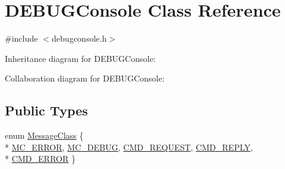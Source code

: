 \hypertarget{class_d_e_b_u_g_console}{}\section{D\+E\+B\+U\+G\+Console Class Reference}
\label{class_d_e_b_u_g_console}


{\ttfamily \#include $<$debugconsole.\+h$>$}



Inheritance diagram for D\+E\+B\+U\+G\+Console\+:


Collaboration diagram for D\+E\+B\+U\+G\+Console\+:
\subsection*{Public Types}
\begin{DoxyCompactItemize}
\item 
enum \hyperlink{class_d_e_b_u_g_console_ab4d5228b2f3681131add4278aca4127f}{Message\+Class} \{ \\*
\hyperlink{class_d_e_b_u_g_console_ab4d5228b2f3681131add4278aca4127fa2768f57752c9bf803b24ad8f6a49d52b}{M\+C\+\_\+\+E\+R\+R\+O\+R}, 
\hyperlink{class_d_e_b_u_g_console_ab4d5228b2f3681131add4278aca4127fa62448f948e5d91cbcb8104a84b549ffa}{M\+C\+\_\+\+D\+E\+B\+U\+G}, 
\hyperlink{class_d_e_b_u_g_console_ab4d5228b2f3681131add4278aca4127fa5869851a28d5453b673600a40b42f93c}{C\+M\+D\+\_\+\+R\+E\+Q\+U\+E\+S\+T}, 
\hyperlink{class_d_e_b_u_g_console_ab4d5228b2f3681131add4278aca4127fa4404df69deee7c2e08611e07dde45bcb}{C\+M\+D\+\_\+\+R\+E\+P\+L\+Y}, 
\\*
\hyperlink{class_d_e_b_u_g_console_ab4d5228b2f3681131add4278aca4127fac1e3404266b5c91f0b39be25a1bc714e}{C\+M\+D\+\_\+\+E\+R\+R\+O\+R}
 \}
\end{DoxyCompactItemize}
